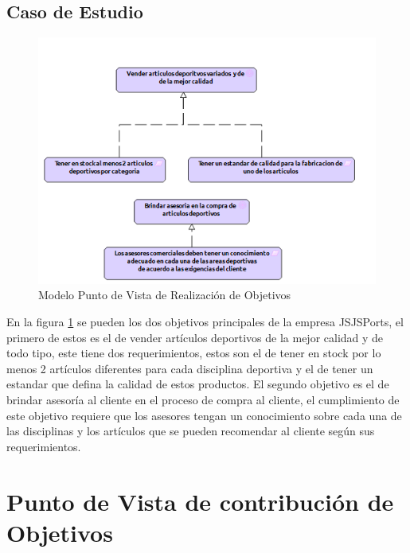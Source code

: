 \subsection{Caso de Estudio}

\begin{figure}[th!]
	\centering
	\includegraphics[width=0.5\linewidth]{arquitectura/imagenes/PuntoVistaRealizacionObjetivos}
	\caption{Modelo Punto de Vista de Realización de Objetivos}
	\label{ModeloRealizacionObjetivos}
\end{figure}

En la figura \ref{ModeloRealizacionObjetivos} se pueden los dos objetivos principales de la empresa JSJSPorts, el primero de estos es el de vender artículos deportivos de la mejor calidad y de todo tipo, este tiene dos requerimientos, estos son el de tener en stock por lo menos 2 artículos diferentes para cada disciplina deportiva y el de tener un estandar que defina la calidad de estos productos.\newline
El segundo objetivo  es el de brindar asesoría al cliente en el proceso de compra al cliente, el cumplimiento de  este objetivo requiere que los asesores tengan un conocimiento sobre cada una de las disciplinas y los artículos que se pueden recomendar al cliente según sus requerimientos.

\newpage

\section{Punto de Vista de contribución de Objetivos}

